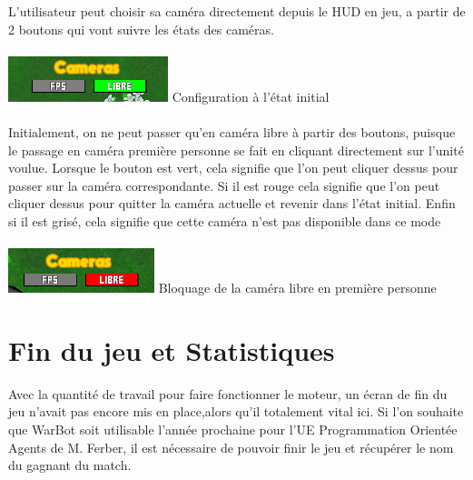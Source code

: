 \documentclass{report}
\begin{document}
L’utilisateur peut choisir sa caméra directement depuis le HUD en jeu,  a partir de 2 boutons qui vont suivre les états des caméras.

\paragraph{}
\begin{center}
\includegraphics[scale=1]{DATA/cem.png}
 {Configuration à l’état initial}
\end{center}
\paragraph{}

Initialement, on ne peut passer qu’en caméra libre à partir des boutons, puisque le passage en caméra première personne se fait en cliquant directement sur l’unité voulue.
Lorsque le bouton est vert, cela signifie que l’on peut cliquer dessus pour passer sur la caméra correspondante. Si il est rouge cela signifie que l’on peut cliquer dessus pour quitter la caméra actuelle et revenir dans l’état initial. 
Enfin si il est grisé, cela signifie que cette caméra n’est pas disponible dans ce mode

\paragraph{}
\begin{center}
\includegraphics[scale=1]{DATA/Sanstitre3.png}
 {Bloquage de la caméra libre en première personne}
\end{center}
\paragraph{}
\newpage


\section{Fin du jeu et Statistiques}

Avec la quantité de travail pour faire fonctionner le moteur, un écran de fin du jeu n’avait pas encore mis en place,alors qu’il totalement vital ici. Si l’on souhaite que WarBot soit utilisable l’année prochaine pour l’UE Programmation Orientée Agents de M. Ferber, il est nécessaire de pouvoir finir le jeu et récupérer le nom du gagnant du match.
\end{document}
